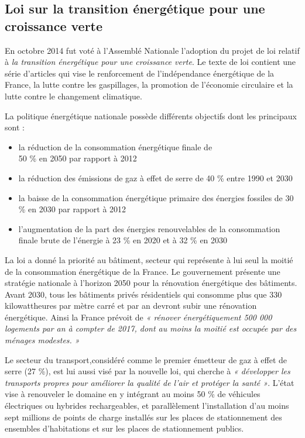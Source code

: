 \subsection{Loi sur la transition énergétique pour une croissance verte}


En octobre 2014 fut voté à l'Assemblé Nationale l’adoption du projet de loi relatif à \textit{la transition énergétique pour une croissance verte}. Le texte de loi contient une série d’articles qui vise le renforcement de l’indépendance énergétique de la France, la lutte contre les gaspillages, la promotion de l’économie circulaire et la lutte contre le changement climatique.


\bigbreak
La politique énergétique nationale possède différents objectifs dont les principaux sont \cite{loi_te} :
\begin{itemize}
  \item la réduction de la consommation énergétique finale de\\50 \% en 2050 par rapport à 2012
  \item la réduction des émissions de gaz à effet de serre de 40 \% entre 1990 et 2030
  \item la baisse de la consommation énergétique primaire des énergies fossiles de 30 \% en 2030 par rapport à 2012
  \item l'augmentation de la part des énergies renouvelables de la consommation finale brute de l’énergie à 23 \% en 2020 et à 32 \% en 2030
\end{itemize}


\bigbreak
La loi a donné la priorité au bâtiment, secteur qui représente à lui seul la moitié de la consommation énergétique de la France. Le gouvernement présente une stratégie nationale à l’horizon 2050 pour la rénovation énergétique des bâtiments. Avant 2030, tous les bâtiments privés résidentiels qui consomme plus que 330 kilowattheures par mètre carré et par an devront subir une rénovation énergétique. Ainsi la France prévoit de \textit{« rénover énergétiquement 500 000 logements par an à compter de 2017, dont au moins la moitié est occupée par des ménages modestes. »}


\bigbreak
Le secteur du transport,considéré comme le premier émetteur de gaz à effet de serre (27 \%), est lui aussi visé par la nouvelle loi, qui cherche à \textit{« développer les transports propres pour améliorer la qualité de l’air et protéger la santé »}. L’état vise à renouveler le domaine en y intégrant au moins 50 \% de véhicules électriques ou hybrides rechargeables, et parallèlement l’installation d’au moins sept millions de points de charge installés sur les places de stationnement des ensembles d’habitations et sur les places de stationnement publics.


